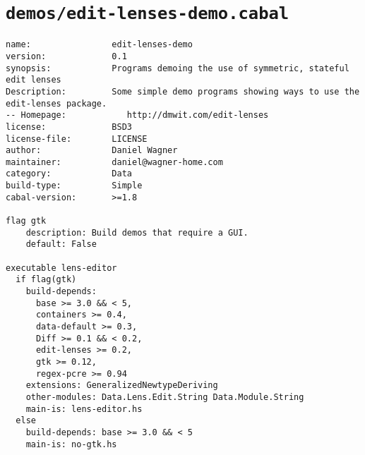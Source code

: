 \section{\texttt{demos/edit-lenses-demo.cabal}}
\begin{verbatim}
name:                edit-lenses-demo
version:             0.1
synopsis:            Programs demoing the use of symmetric, stateful edit lenses
Description:         Some simple demo programs showing ways to use the edit-lenses package.
-- Homepage:            http://dmwit.com/edit-lenses
license:             BSD3
license-file:        LICENSE
author:              Daniel Wagner
maintainer:          daniel@wagner-home.com
category:            Data
build-type:          Simple
cabal-version:       >=1.8

flag gtk
    description: Build demos that require a GUI.
    default: False

executable lens-editor
  if flag(gtk)
    build-depends:
      base >= 3.0 && < 5,
      containers >= 0.4,
      data-default >= 0.3,
      Diff >= 0.1 && < 0.2,
      edit-lenses >= 0.2,
      gtk >= 0.12,
      regex-pcre >= 0.94
    extensions: GeneralizedNewtypeDeriving
    other-modules: Data.Lens.Edit.String Data.Module.String
    main-is: lens-editor.hs
  else
    build-depends: base >= 3.0 && < 5
    main-is: no-gtk.hs

\end{verbatim}

